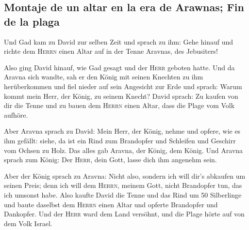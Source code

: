 \hypertarget{montaje-de-un-altar-en-la-era-de-arawnas-fin-de-la-plaga}{%
\subsection{Montaje de un altar en la era de Arawnas; Fin de la
plaga}\label{montaje-de-un-altar-en-la-era-de-arawnas-fin-de-la-plaga}}

 Und Gad kam zu David zur selben Zeit und sprach zu ihm:
Gehe hinauf und richte dem \textsc{Herrn} einen Altar auf in der Tenne
Aravnas, des Jebusiters!

 Also ging David hinauf, wie Gad gesagt und der
\textsc{Herr} geboten hatte.  Und da Aravna sich wandte,
sah er den König mit seinen Knechten zu ihm herüberkommen und fiel
nieder auf sein Angesicht zur Erde  und sprach: Warum
kommt mein Herr, der König, zu seinem Knecht? David sprach: Zu kaufen
von dir die Tenne und zu bauen dem \textsc{Herrn} einen Altar, dass die
Plage vom Volk aufhöre.

 Aber Aravna sprach zu David: Mein Herr, der König, nehme
und opfere, wie es ihm gefällt: siehe, da ist ein Rind zum Brandopfer
und Schleifen und Geschirr vom Ochsen zu Holz.  Das alles
gab Aravna, der König, dem König. Und Aravna sprach zum König: Der
\textsc{Herr}, dein Gott, lasse dich ihm angenehm sein.

 Aber der König sprach zu Aravna: Nicht also, sondern ich
will dir's abkaufen um seinen Preis; denn ich will dem \textsc{Herrn},
meinem Gott, nicht Brandopfer tun, das ich umsonst habe. Also kaufte
David die Tenne und das Rind um 50 Silberlinge  und baute
daselbst dem \textsc{Herrn} einen Altar und opferte Brandopfer und
Dankopfer. Und der \textsc{Herr} ward dem Land versöhnt, und die Plage
hörte auf von dem Volk Israel.
